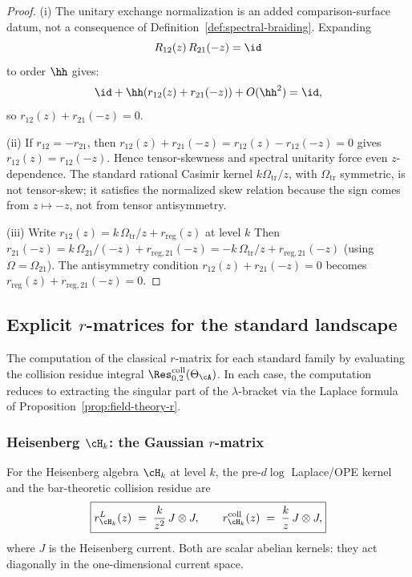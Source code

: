 \begin{proof}
(i) The unitary exchange normalization is an added comparison-surface
datum, not a consequence of Definition~\ref{def:spectral-braiding}.
Expanding
\[
R_{12}(z)\, R_{21}(-z) = \id
\]
to order $\hh$ gives:
\[
\id + \hh(r_{12}(z) + r_{21}(-z)) + O(\hh^2) = \id,
\]
so $r_{12}(z) + r_{21}(-z) = 0$.

(ii) If $r_{12} = -r_{21}$, then
$r_{12}(z) + r_{21}(-z) = r_{12}(z) - r_{12}(-z) = 0$ gives
$r_{12}(z) = r_{12}(-z)$.  Hence tensor-skewness and spectral
unitarity force even \(z\)-dependence.  The standard rational Casimir
kernel \(k\Omega_{\mathrm{tr}}/z\), with \(\Omega_{\mathrm{tr}}\)
symmetric, is not tensor-skew; it satisfies the normalized skew relation
because the sign comes from \(z\mapsto -z\), not from tensor
antisymmetry.

(iii) Write $r_{12}(z) = k\,\Omega_{\mathrm{tr}}/z + r_{\mathrm{reg}}(z)$
at level $k$ Then $r_{21}(-z) = k\,\Omega_{21}/(-z) + r_{\mathrm{reg},21}(-z)
= -k\,\Omega_{\mathrm{tr}}/z + r_{\mathrm{reg},21}(-z)$ (using
$\Omega = \Omega_{21}$). The antisymmetry condition
$r_{12}(z) + r_{21}(-z) = 0$ becomes
$r_{\mathrm{reg}}(z) + r_{\mathrm{reg},21}(-z) = 0$.
\end{proof}

\subsection{Explicit $r$-matrices for the standard landscape}

The computation of the classical $r$-matrix for each standard family by
evaluating the collision residue integral
$\Res^{\mathrm{coll}}_{0,2}(\Theta_\cA)$. In each case, the
computation reduces to extracting the singular part of the
$\lambda$-bracket via the Laplace formula of
Proposition~\ref{prop:field-theory-r}.

\subsubsection{Heisenberg $\cH_k$: the Gaussian $r$-matrix}

\begin{proposition}
For the Heisenberg algebra $\cH_k$ at level $k$, the pre-\textup{\(d\log\)}
Laplace/OPE kernel and the bar-theoretic collision residue are
\begin{equation}
\boxed{
r^L_{\cH_k}(z) \;=\; \frac{k}{z^2}\, J \otimes J,
\qquad
r^{\mathrm{coll}}_{\cH_k}(z) \;=\; \frac{k}{z}\, J \otimes J,
}
\end{equation}
where $J$ is the Heisenberg current. Both are scalar abelian kernels:
they act diagonally in the one-dimensional current space.
\end{proposition}

